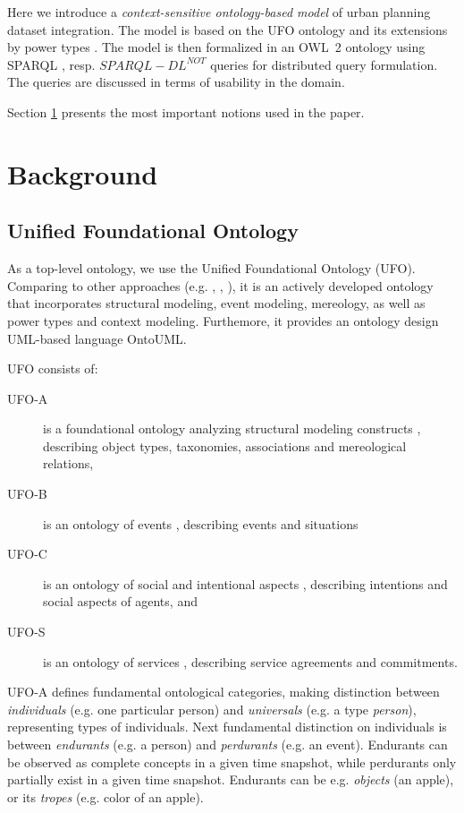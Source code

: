 \documentclass{lncs-template/llncs}
\begin{document}
Here we introduce a \emph{context-sensitive ontology-based model} of urban planning dataset integration. The model is based on the UFO ontology  \cite{guizzardi2005ontological} and its extensions by power types \cite{guizzardi2015powertypes}. The model is then formalized in an OWL~2 \cite{owl2-overview} ontology using SPARQL \cite{2013sparql}, resp. $SPARQL-DL^{NOT}$ \cite{Kremen:2012:EOQ:2607597.2607601} queries for distributed query formulation. The queries are discussed in terms of usability in the domain.

Section \ref{sec:bkg} presents the most important notions used in the paper.


\section{Background}\label{sec:bkg} 

\subsection{Unified Foundational Ontology}

As a top-level ontology, we use the Unified Foundational Ontology (UFO). Comparing to other approaches (e.g. \cite{ggmos2002sod}, \cite{gs2009sstdso}, \cite{np2001tsuo}), it is an actively developed ontology that incorporates structural modeling, event modeling, mereology, as well as power types and context modeling. Furthemore, it provides an ontology design UML-based language OntoUML.

UFO consists of:
\begin{description}
 \item[UFO-A] is a foundational ontology analyzing structural modeling constructs \cite{g2006ofscm}, describing object types, taxonomies, associations and mereological relations,
 \item[UFO-B] is an ontology of events \cite{gwaga2013tofcme}, describing events and situations
 \item[UFO-C] is an ontology of social and intentional aspects \cite{gr2005bsao}, describing intentions and social aspects of agents, and
 \item[UFO-S] is an ontology of services \cite{naagps2013tcbros}, describing service agreements and commitments.
\end{description}

UFO-A defines fundamental ontological categories, making distinction between \emph{individuals} (e.g. one particular person) and \emph{universals} (e.g. a type \emph{person}), representing types of individuals. Next fundamental distinction on individuals is between \emph{endurants} (e.g. a person) and \emph{perdurants} (e.g. an event). Endurants can be observed as complete concepts in a given time snapshot, while perdurants only partially exist in a given time snapshot. Endurants can be e.g. \emph{objects} (an apple), or its \emph{tropes} (e.g. color of an apple). 
\end{document}
